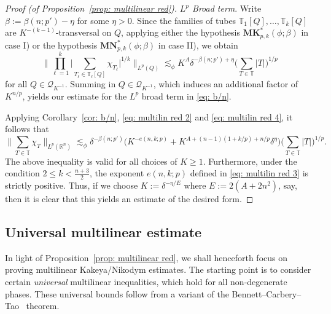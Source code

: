 \documentclass[reqno]{amsart}
\numberwithin{equation}{section}
\newcommand{\R}{\mathbb{R}}
\newcommand{\T}{\mathbb{T}}
\newcommand{\cQ}{\mathcal{Q}}
\newcommand{\bK}{\mathbf{K}}
\newcommand{\bM}{\mathbf{M}}
\newcommand{\bN}{\mathbf{N}}
\theoremstyle{plain}
\theoremstyle{definition}
\begin{document}
\begin{proof}[Proof (of Proposition~\ref{prop: multilinear red})]
\noindent \textit{$L^p$ Broad term}. Write $\beta := \beta(n; p') - \eta$ for some $\eta > 0$. Since the families of tubes $\T_1[Q], \dots, \T_k[Q]$ are $K^{-(k-1)}$-transversal on $Q$, applying either the hypothesis $\bM\bK_{p, k}^*(\phi; \beta)$ in case I) or the hypothesis $\bM\bN_{p, k}^*(\phi; \beta)$ in case II), we obtain
\begin{equation}\label{eq: multilin red 4}
   \Big\| \prod_{\ell = 1}^k \big|\sum_{T_{\ell} \in \T_{\ell}[Q]} \chi_{T_{\ell}}\big|^{1/k}\Big\|_{L^p(Q)} \lesssim_{\phi} K^A \delta^{-\beta(n;p')+ \eta} \Big(\sum_{T \in \T} |T| \Big)^{1/p} 
\end{equation}
for all $Q \in \cQ_{K^{-1}}$. Summing in $Q \in \cQ_{K^{-1}}$, which induces an additional factor of $K^{n/p}$, yields our estimate for the $L^p$ broad term in \eqref{eq: b/n}.\medskip

Applying Corollary~\ref{cor: b/n}, \eqref{eq: multilin red 2} and \eqref{eq: multilin red 4}, it follows that 
\begin{equation*}
    \big\|\sum_{T \in \T} \chi_T\big\|_{L^p(\R^n)} \lesssim_{\phi} \delta^{-\beta(n;p')} \big(K^{-e(n,k;p)} + K^{A+(n-1)(1+k/p) + n/p} \delta^{\eta}\big)\Big(\sum_{T \in \T} |T| \Big)^{1/p}.
\end{equation*}
The above inequality is valid for all choices of $K \geq 1$. Furthermore, under the condition $2 \leq k < \frac{n+3}{2}$, the exponent $e(n,k;p)$ defined in \eqref{eq: multilin red 3} is strictly positive. Thus, if we choose $K := \delta^{-\eta/E}$ where $E := 2(A + 2n^2)$, say, then it is clear that this yields an estimate of the desired form.
\end{proof}





\subsection{Universal multilinear estimate} In light of Proposition~\ref{prop: multilinear red}, we shall henceforth focus on proving multilinear Kakeya/Nikodym estimates. The starting point is to consider certain \textit{universal} multilinear inequalities, which hold for all non-degenerate phases. These universal bounds follow from a variant of the Bennett--Carbery--Tao~\cite{BCT2006} theorem. 
\end{document}
